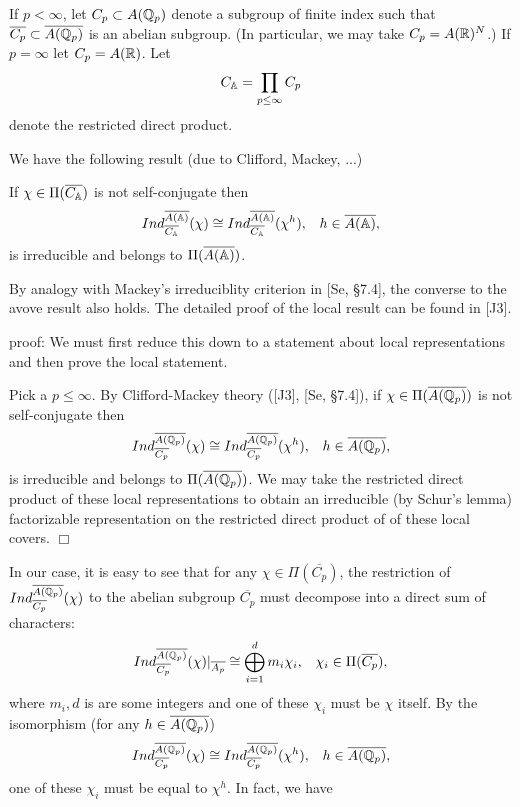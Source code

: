 If $p<\infty$, let $C_p\subset A({\Bbb{Q}}_p)$ denote a subgroup
of finite index such that
$\overline{C_p}\subset \overline{A({\Bbb{Q}}_p)}$ is
an abelian subgroup. (In particular, we may take
$C_p=A({\Bbb{R}})^N$.) If $p=\infty$ let $C_p=A({\Bbb{R}})$. Let
\begin{equation}
C_{{\Bbb{A}}}=\prod_{p\leq \infty }C_p
\end{equation}
denote the restricted direct product.

We have the following result (due to Clifford, Mackey,
...)

\begin{lemma}
If $\chi \in \Pi (\overline{C_{{\Bbb{A}}}})$ is not self-conjugate then 
\[
Ind_{\overline{C_{{\Bbb{A}}}}}^{\overline{A({\Bbb{A}})}}(\chi )
\cong Ind_{\overline{C_{{\Bbb{A}}}}}^{\overline{A({\Bbb{A}})}}(\chi ^h),
\;\;\;h\in  \overline{A({\Bbb{A}})},
\]
is irreducible and belongs to $\Pi (\overline{A({\Bbb{A}})})$.
\end{lemma}

\begin{remark} By analogy with Mackey's irreduciblity
criterion in [Se, \S 7.4], the converse to the avove result also
holds. The detailed proof of the local result can be found in
[J3].
\end{remark}

\textsf{proof}: We must first reduce this down to a statement about local
representations and then prove the local statement.

Pick a $p\leq \infty $. By Clifford-Mackey theory ([J3], [Se, \S 7.4]),
if $\chi \in \Pi (\overline{A({\Bbb{Q}}_p)})$ is not self-conjugate then 
\begin{equation}
Ind_{\overline{C_p}}^{\overline{A({\Bbb{Q}}_p)}}(\chi )
\cong Ind_{\overline{C_p}}^{\overline{A({\Bbb{Q}}_p)}}(\chi ^h),
\;\;\;h\in \overline{A({\Bbb{Q}}_p)},
\end{equation}
is irreducible and belongs to $\Pi (\overline{A({\Bbb{Q}}_p)})$. We may take
the restricted direct product of these local representations to obtain an
irreducible (by Schur's lemma) factorizable representation on
the restricted direct product of of these local covers. $\Box $

In our case, it is easy to see that for any
$\chi \in \Pi (\overline{C_p})$,
the restriction of
$Ind_{\overline{C_p}}^{\overline{A({\Bbb{Q}}_p)}}(\chi )$
to the abelian subgroup
$\overline{C_p}$ must decompose into a direct sum of
characters: 
\begin{equation}
Ind_{\overline{C_p}}^{\overline{A({\Bbb{Q}}_p)}}(\chi )|_{\overline{A_p}}
\cong \bigoplus_{i=1}^dm_i\chi _i,
\;\;\;\chi _i\in \Pi (\overline{C_p}),
\end{equation}
where $m_i,d$ is are some integers and
one of these $\chi _i$ must be $\chi $ itself. By the isomorphism
(for any $h\in \overline{A({\Bbb{Q}}_p)}$)
\begin{equation}
Ind_{\overline{C_p}}^{\overline{A({\Bbb{Q}}_p)}}(\chi )
\cong Ind_{\overline{C_p}}^{\overline{A({\Bbb{Q}}_p)}}(\chi ^h),
\;\;\;h\in \overline{A({\Bbb{Q}}_p)},
\end{equation}
one of these $\chi _i$ must be equal to $\chi ^h$.
In fact, we have

